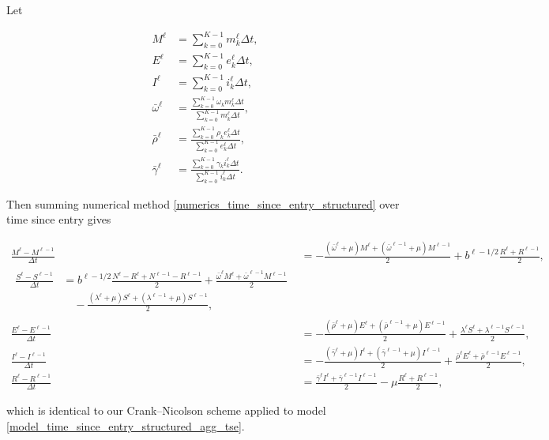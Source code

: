 \documentclass{jpmarticle}
\let\subequationsorig\subequations%
\let\endsubequationsorig\endsubequations%
\renewenvironment{subequations}{
  \subequationsorig
  \renewcommand{\theequation}{\theparentequation.\arabic{equation}}
}{
  \endsubequationsorig
}
\begin{document}
Let
\begin{subequations}
  \begin{align}
    M^{\ell}
    &= \sum_{k = 0}^{K - 1} m_k^{\ell} \Delta t,
    \\
    E^{\ell}
    &= \sum_{k = 0}^{K - 1} e_k^{\ell} \Delta t,
    \\
    I^{\ell}
    &= \sum_{k = 0}^{K - 1} i_k^{\ell} \Delta t,
    \\
    \bar{\omega}^{\ell}
    &= \frac{\sum_{k = 0}^{K - 1} \omega_k m_k^{\ell} \Delta t}
      {\sum_{k = 0}^{K - 1} m_k^{\ell} \Delta t},
    \\
    \bar{\rho}^{\ell}
    &= \frac{\sum_{k = 0}^{K - 1} \rho_k e_k^{\ell} \Delta t}
      {\sum_{k = 0}^{K - 1} e_k^{\ell} \Delta t},
    \\
    \bar{\gamma}^{\ell}
    &= \frac{\sum_{k = 0}^{K - 1} \gamma_k i_k^{\ell} \Delta t}
      {\sum_{k = 0}^{K - 1} i_k^{\ell} \Delta t}.
  \end{align}
\end{subequations}
Then summing numerical method
\eqref{numerics_time_since_entry_structured} over time since entry
gives
\begin{subequations}
  \label{numerics_time_since_entry_structured_agg_tse}
  \begin{align}
    \frac{M^{\ell}  - M^{\ell - 1}}{\Delta t}
    &= - \frac{(\bar{\omega}^{\ell} + \mu) M^{\ell}
      + (\bar{\omega}^{\ell - 1} + \mu) M^{\ell - 1}}{2}
      + b^{\ell - 1 / 2} \frac{R^{\ell} + R^{\ell - 1}}{2},
    \\
    \begin{split}
      \frac{S^{\ell} - S^{\ell - 1}}{\Delta t}
      &= b^{\ell - 1 / 2}
      \frac{N^{\ell} - R^{\ell} + N^{\ell - 1} - R^{\ell - 1}}{2}
      + \frac{\bar{\omega}^{\ell} M^{\ell}
        + \bar{\omega}^{\ell - 1} M^{\ell - 1}}{2}
      \\ & \quad {}
      - \frac{(\lambda^{\ell} + \mu) S^{\ell}
        + (\lambda^{\ell - 1} + \mu) S^{\ell - 1}}{2},
    \end{split}
    \\
    \frac{E^{\ell}  - E^{\ell - 1}}{\Delta t}
    &= - \frac{(\bar{\rho}^{\ell} + \mu) E^{\ell}
      + (\bar{\rho}^{\ell - 1} + \mu) E^{\ell - 1}}{2}
      + \frac{\lambda^{\ell} S^{\ell}
      + \lambda^{\ell - 1} S^{\ell - 1}}{2},
    \\
    \frac{I^{\ell}  - I^{\ell - 1}}{\Delta t}
    &= - \frac{(\bar{\gamma}^{\ell} + \mu) I^{\ell}
      + (\bar{\gamma}^{\ell - 1} + \mu) I^{\ell - 1}}{2}
      + \frac{\bar{\rho}^{\ell} E^{\ell}
      + \bar{\rho}^{\ell - 1} E^{\ell - 1}}{2},
    \\
    \frac{R^{\ell} - R^{\ell - 1}}{\Delta t}
    &= \frac{\bar{\gamma}^{\ell} I^{\ell}
      + \bar{\gamma}^{\ell - 1} I^{\ell - 1}}{2}
      - \mu \frac{R^{\ell} + R^{\ell - 1}}{2},
  \end{align}
\end{subequations}
which is identical to our Crank--Nicolson scheme applied to model
\eqref{model_time_since_entry_structured_agg_tse}.
\end{document}
